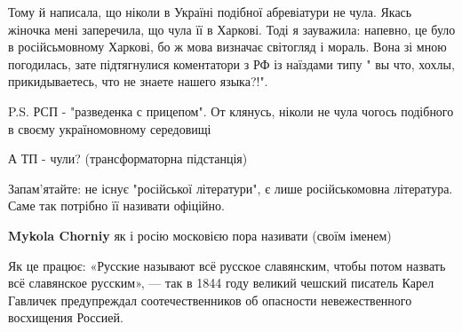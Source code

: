\begin{itemize}
Тому й написала, що ніколи в Україні подібної абревіатури не чула. Якась
жіночка мені заперечила, що чула її в Харкові. Тоді я зауважила: напевно, це
було в російсьмовному Харкові, бо ж мова визначає світогляд і мораль. Вона зі
мною погодилась, зате підтягнулися коментатори з РФ із наїздами типу " вы что,
хохлы, прикидываетесь, что не знаете нашего языка?!".

P.S. РСП - "разведенка с прицепом". От клянусь, ніколи не чула чогось подібного
в своєму україномовному середовищі

\begin{itemize}
 
А ТП - чули?
(трансформаторна підстанція)
\end{itemize}

 
Запам'ятайте: не існує "російської літератури", є лише російськомовна
література. Саме так потрібно її називати офіційно.

\begin{itemize}
 
\textbf{Mykola Chorniy} як і росію московією пора називати (своїм іменем)

 
Як це працює:
«Русские называют всё русское славянским, чтобы потом назвать всё славянское русским», — так в 1844 году великий чешский писатель Карел Гавличек предупреждал соотечественников об опасности невежественного восхищения Россией.

 

\end{itemize}
\end{itemize}
